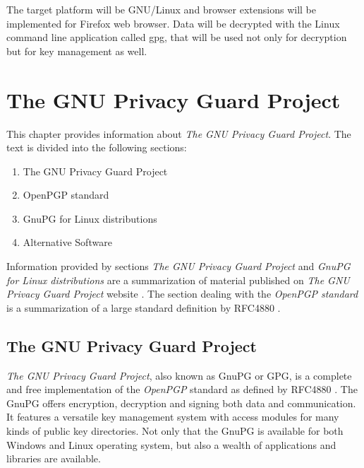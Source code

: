 The target platform will be GNU/Linux and browser extensions will be implemented for Firefox web browser. Data will be decrypted with the Linux command line application called gpg, that will be used not only for decryption but for key management as well.


\chapter{The GNU Privacy Guard Project}
This chapter provides information about \textit{The GNU Privacy Guard Project}. The text is divided into the following sections:
\begin{enumerate}
    \item The GNU Privacy Guard Project
    \item OpenPGP standard
    \item GnuPG for Linux distributions
    \item Alternative Software
\end{enumerate}

Information provided by sections \textit{The GNU Privacy Guard Project} and \textit{GnuPG for Linux distributions} are a summarization of material published on \textit{The GNU Privacy Guard Project} website \cite{GnuPG}. The section dealing with the \textit{OpenPGP standard} is a summarization of a large standard definition by RFC4880 \cite{RFC4880}.

\section{The GNU Privacy Guard Project}
\textit{The GNU Privacy Guard Project}, also known as GnuPG or GPG, is a complete and free implementation of the \textit{OpenPGP} standard as defined by RFC4880 \cite{RFC4880}. The GnuPG offers encryption, decryption and signing both data and communication. It features a versatile key management system with access modules for many kinds of public key directories. Not only that the GnuPG is available for both Windows and Linux operating system, but also a wealth of applications and libraries are available.

